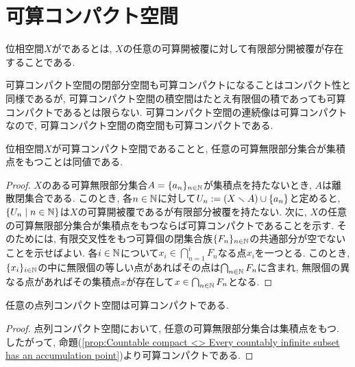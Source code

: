 \documentclass[uplatex, dvipdfmx, a4paper, 12pt, class=jsbook, crop=false]{standalone}
\begin{document}
\section{可算コンパクト空間}
\label{sec:countably-compact-spaces}

\newcommand{\starset}[2]{\mathrm{St}\left(#1 , \: #2\right)}
\newcommand{\sstarset}[3]{\mathrm{St}^{#1}\left(#2 , \: #3 \right)}

\begin{definition}
	位相空間$ X $がであるとは, $ X $の任意の可算開被覆に対して有限部分開被覆が存在することである.
\end{definition}

可算コンパクト空間の閉部分空間も可算コンパクトになることはコンパクト性と同様であるが, 可算コンパクト空間の積空間はたとえ有限個の積であっても可算コンパクトであるとは限らない. 可算コンパクト空間の連続像は可算コンパクトなので, 可算コンパクト空間の商空間も可算コンパクトである.

\begin{proposition}
	\label{prop:Countable compact <> Every countably infinite subset has an accumulation point}
	位相空間$ X $が可算コンパクト空間であることと, 任意の可算無限部分集合が集積点をもつことは同値である.
\end{proposition}

\begin{proof}
	$ X $のある可算無限部分集合$ A = \{a_n\}_{n \in \mathbb{N}} $が集積点を持たないとき, $ A $は離散閉集合である. このとき, 各$ n \in \mathbb{N} $に対して$ U_n \mathrel{:=} (X \smallsetminus A) \cup \{a_n\} $と定めると, $ \setcomp{U_n}{n \in \N} $は$ X $の可算開被覆であるが有限部分被覆を持たない. 次に, $ X $の任意の可算無限部分集合が集積点をもつならば可算コンパクトであることを示す. そのためには, 有限交叉性をもつ可算個の閉集合族$ \{F_n\}_{n \in \mathbb{N}} $の共通部分が空でないことを示せばよい. 各$ i \in \mathbb{N} $について$ x_i \in \bigcap_{n=1}^{i}F_n $なる点$ x_i $を一つとる. このとき, $ \{x_i\}_{i \in \mathbb{N}} $の中に無限個の等しい点があればその点は$ \bigcap_{n \in \mathbb{N}} F_n $に含まれ, 無限個の異なる点があればその集積点$ x $が存在して$ x \in \bigcap_{n \in \mathbb{N}} F_n $となる.
\end{proof}

\begin{proposition}
	任意の点列コンパクト空間は可算コンパクトである.
\end{proposition}

\begin{proof}
	点列コンパクト空間において, 任意の可算無限部分集合は集積点をもつ. したがって, 命題(\ref{prop:Countable compact <> Every countably infinite subset has an accumulation point})より可算コンパクトである.
\end{proof}
\end{document}
